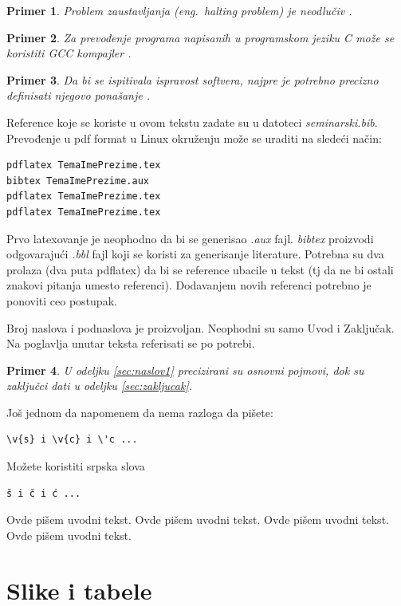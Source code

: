 \documentclass[a4paper]{article}
\newtheorem{primer}{Primer}[section]
\begin{document}
\begin{primer}
Problem zaustavljanja (eng.~{\em halting problem}) je neodlučiv \cite{haltingproblem}.
\end{primer}

\begin{primer}
Za prevođenje programa napisanih u programskom jeziku C može se koristiti GCC kompajler \cite{gcc}.
\end{primer}

\begin{primer}
 Da bi se ispitivala ispravost softvera, najpre je potrebno precizno definisati njegovo ponašanje \cite{laski2009software}. 
\end{primer}

Reference koje se koriste u ovom tekstu zadate su u datoteci {\em seminarski.bib}. Prevođenje u pdf format u Linux okruženju može se uraditi na sledeći način:
\begin{verbatim}
pdflatex TemaImePrezime.tex 
bibtex TemaImePrezime.aux 
pdflatex TemaImePrezime.tex 
pdflatex TemaImePrezime.tex 
\end{verbatim}
Prvo latexovanje je neophodno da bi se generisao {\em .aux} fajl. {\em bibtex} proizvodi odgovarajući {\em .bbl} fajl koji se koristi za generisanje literature. 
Potrebna su dva prolaza (dva puta pdflatex) da bi se reference ubacile u tekst (tj da ne bi ostali znakovi pitanja umesto referenci). Dodavanjem novih referenci potrebno je ponoviti ceo postupak.  


Broj naslova i podnaslova je proizvoljan. Neophodni su samo Uvod i Zaključak. Na poglavlja unutar teksta referisati se po potrebi. 
\begin{primer}
U odeljku \ref{sec:naslov1} precizirani su osnovni pojmovi, dok su zaključci dati u odeljku \ref{sec:zakljucak}.
\end{primer}

Još jednom da napomenem da nema razloga da pišete:
\begin{verbatim}
\v{s} i \v{c} i \'c ...
\end{verbatim}
Možete koristiti srpska slova
\begin{verbatim}
š i č i ć ... 
\end{verbatim}


Ovde pišem uvodni tekst.
Ovde pišem uvodni tekst. 
Ovde pišem uvodni tekst. 
Ovde pišem uvodni tekst. 


\section{Slike i tabele}
\label{slike_i_tabele}
\end{document}
